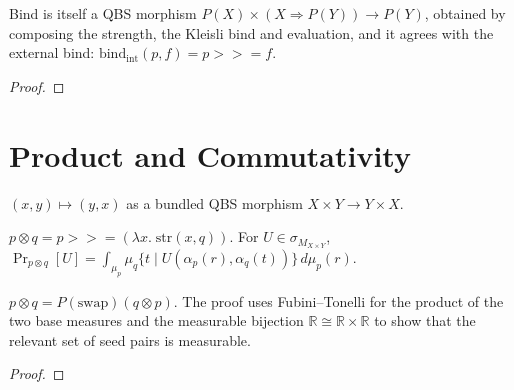 \begin{theorem}\label{thm:qbs_bind_internal}
  \rocqok
  Bind is itself a QBS morphism
  $P(X) \times (X \Rightarrow P(Y)) \to P(Y)$, obtained by composing the
  strength, the Kleisli bind and evaluation, and it agrees with the
  external bind: $\mathrm{bind}_{\mathrm{int}}(p, f) =
  p \mathbin{>\!\!>\!\!=} f$.
\end{theorem}
\begin{proof}\rocqok\end{proof}


\section{Product and Commutativity}\label{sec:commutativity}

\begin{definition}[Swap]\label{def:qbs_swap}
  \rocqok
  $(x, y) \mapsto (y, x)$ as a bundled QBS morphism
  $X \times Y \to Y \times X$.
\end{definition}

\begin{definition}\label{def:qbs_prod}
  \rocqok
  $p \otimes q = p \mathbin{>\!\!>\!\!=} (\lambda x.\; \mathrm{str}(x, q))$.
  For $U \in \sigma_{M_{X \times Y}}$,
  $\Pr_{p \otimes q}[U] = \int_{\mu_p} \mu_q\{t \mid
  U(\alpha_p(r), \alpha_q(t))\}\, d\mu_p(r)$.
\end{definition}

\begin{theorem}\label{thm:qbs_prod_comm}
  \rocqok
  $p \otimes q = P(\mathrm{swap})(q \otimes p)$.
  The proof uses Fubini--Tonelli for the product of the two base measures
  and the measurable bijection $\mathbb{R} \cong \mathbb{R} \times
  \mathbb{R}$ to show that the relevant set of seed pairs is measurable.
\end{theorem}
\begin{proof}\rocqok\end{proof}

